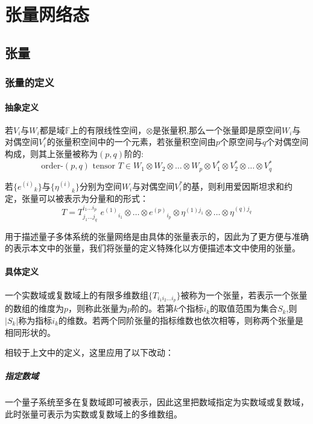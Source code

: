 
\chapter{张量网络态}

\section{张量}

\subsection{张量的定义}

\subsubsection{抽象定义}

若$V_i$与$W_i$都是域$\mathbb{F}$上的有限线性空间，$\otimes$是张量积,那么一个张量即是原空间$W_i$与对偶空间$V^*_i$的张量积空间中的一个元素，若张量积空间由$p$个原空间与$q$个对偶空间构成，则其上张量被称为$(p,q)$阶的:
\[
\text{order-}(p,q) \text{ tensor } T \in W_1 \otimes W_2 \otimes \dots \otimes W_p 
\otimes V^*_1 \otimes V^*_2 \otimes \dots \otimes V^*_q
\]

若$\{{e^{(i)}}_k\}$与$\{{\eta^{(i)}}_k\}$分别为空间$W_i$与对偶空间$V^*_i$的基，则利用爱因斯坦求和约定，张量可以被表示为分量和的形式：
\[
T=T^{i_1\dots i_p}_{j_1\dots j_q} \,\, {e^{(1)}}_{i_1}\otimes\dots\otimes{e^{(p)}}_{i_p}
\otimes {\eta^{(1)j_1}}\otimes\dots\otimes{\eta^{(q)j_q}}
\]

用于描述量子多体系统的张量网络是由具体的张量表示的，因此为了更方便与准确的表示本文中的张量，我们将张量的定义特殊化以方便描述本文中使用的张量。

\subsubsection{具体定义}

一个实数域或复数域上的有限多维数组$\{T_{i_1 i_2\dots i_p}\}$被称为一个张量，若表示一个张量的数组的维度为$p$，则称此张量为$p$阶的。若第$k$个指标$i_k$的取值范围为集合$S_{k}$,则$\lvert S_{k}\rvert$称为指标$i_k$的维数。若两个同阶张量的指标维数也依次相等，则称两个张量是相同形状的。

相较于上文中的定义，这里应用了以下改动：
\paragraph{指定数域}
一个量子系统至多在复数域即可被表示，因此这里把数域指定为实数域或复数域，此时张量可表示为实数或复数域上的多维数组。
